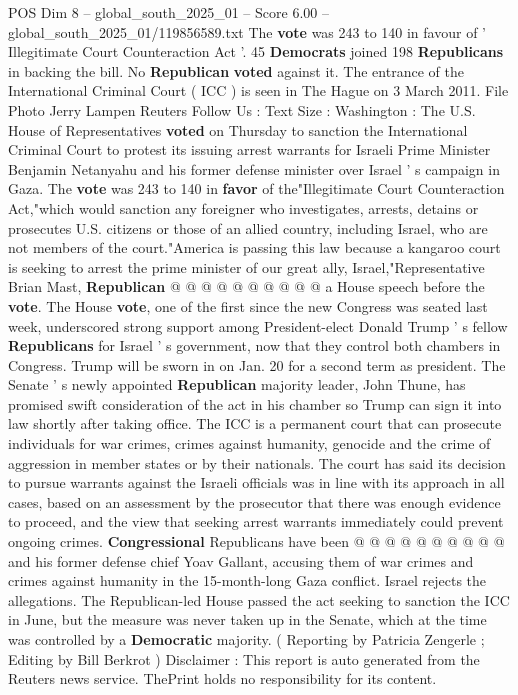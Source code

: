 \begin{textsample}{POS Dim 8 – global\_south\_2025\_01 – Score 6.00 – global\_south\_2025\_01/119856589.txt}  \label{ex:f8_pos_324}
The \textbf{vote} was 243 to 140 in favour of ' Illegitimate Court Counteraction Act '. 45 \textbf{Democrats} joined 198 \textbf{Republicans} in backing the bill.
No \textbf{Republican} \textbf{voted} against it.
The entrance of the International Criminal Court ( ICC ) is seen in The Hague on 3 March 2011.
File Photo Jerry Lampen Reuters Follow Us : Text Size : Washington : The U.S.
House of Representatives \textbf{voted} on Thursday to sanction the International Criminal Court to protest its issuing arrest warrants for Israeli Prime Minister Benjamin Netanyahu and his former defense minister over Israel ' s campaign in Gaza.
The \textbf{vote} was 243 to 140 in \textbf{favor} of the"Illegitimate Court Counteraction Act,"which would sanction any foreigner who investigates, arrests, detains or prosecutes U.S. citizens or those of an allied country, including Israel, who are not members of the court."America is passing this law because a kangaroo court is seeking to arrest the prime minister of our great ally, Israel,"Representative Brian Mast, \textbf{Republican} @ @ @ @ @ @ @ @ @ @ a House speech before the \textbf{vote}.
The House \textbf{vote}, one of the first since the new Congress was seated last week, underscored strong support among President-elect Donald Trump ' s fellow \textbf{Republicans} for Israel ' s government, now that they control both chambers in Congress.
Trump will be sworn in on Jan. 20 for a second term as president.
The Senate ' s newly appointed \textbf{Republican} majority leader, John Thune, has promised swift consideration of the act in his chamber so Trump can sign it into law shortly after taking office.
The ICC is a permanent court that can prosecute individuals for war crimes, crimes against humanity, genocide and the crime of aggression in member states or by their nationals.
The court has said its decision to pursue warrants against the Israeli officials was in line with its approach in all cases, based on an assessment by the prosecutor that there was enough evidence to proceed, and the view that seeking arrest warrants immediately could prevent ongoing crimes. \textbf{Congressional} Republicans have been @ @ @ @ @ @ @ @ @ @ and his former defense chief Yoav Gallant, accusing them of war crimes and crimes against humanity in the 15-month-long Gaza conflict.
Israel rejects the allegations.
The Republican-led House passed the act seeking to sanction the ICC in June, but the measure was never taken up in the Senate, which at the time was controlled by a \textbf{Democratic} majority. ( Reporting by Patricia Zengerle ; Editing by Bill Berkrot ) Disclaimer : This report is auto generated from the Reuters news service.
ThePrint holds no responsibility for its content.

\end{textsample}
